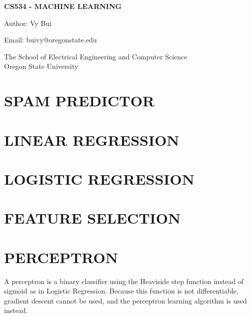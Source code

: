 \documentclass[8pt,letterpaper]{book}
\begin{document}
\begin{titlepage}
    \begin{center}
        \vspace*{4cm}

        \textbf{\Large CS534 - MACHINE LEARNING}

        \vspace{1cm}

        Author: Vy Bui
        
        Email: buivy@oregonstate.edu
 
        \vfill
             
        \vspace{0.8cm}
      
             
        The School of Electrical Engineering and Computer Science\\
        Oregon State University\\
             
    \end{center}
 \end{titlepage}

\tableofcontents

\pagebreak
\chapter{SPAM PREDICTOR}
\chapter{LINEAR REGRESSION}
\chapter{LOGISTIC REGRESSION}
\chapter{FEATURE SELECTION}


\chapter{PERCEPTRON}

A perceptron is a binary classifier using the Heaviside step function instead of 
sigmoid as in Logistic Regression. Because this function is not differentiable, 
gradient descent cannot be used, and the perceptron learning algorithm is used 
instead.
\end{document}
